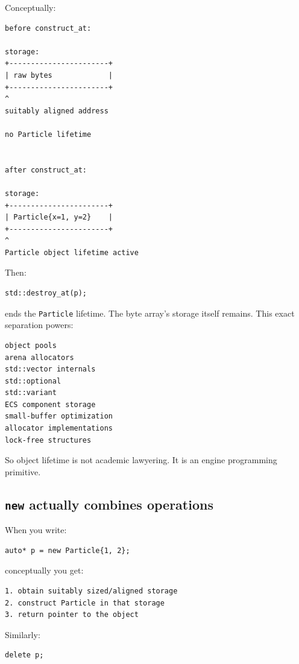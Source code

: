 Conceptually:

\begin{verbatim}
before construct_at:

storage:
+-----------------------+
| raw bytes             |
+-----------------------+
^
suitably aligned address

no Particle lifetime


after construct_at:

storage:
+-----------------------+
| Particle{x=1, y=2}    |
+-----------------------+
^
Particle object lifetime active
\end{verbatim}

Then:

\begin{verbatim}
std::destroy_at(p);
\end{verbatim}

ends the \texttt{Particle} lifetime. The byte array's storage itself remains. This exact separation powers:

\begin{verbatim}
object pools
arena allocators
std::vector internals
std::optional
std::variant
ECS component storage
small-buffer optimization
allocator implementations
lock-free structures
\end{verbatim}

So object lifetime is not academic lawyering. It is an engine programming primitive.

\subsection{\texorpdfstring{\texttt{new} actually combines operations}{new actually combines operations}}\label{05-engine-i-ch002-new-actually-combines-operations}

\hypertarget{05-engine-i-ch002-new-actually-combines-operations}{}

When you write:

\begin{verbatim}
auto* p = new Particle{1, 2};
\end{verbatim}

conceptually you get:

\begin{verbatim}
1. obtain suitably sized/aligned storage
2. construct Particle in that storage
3. return pointer to the object
\end{verbatim}

Similarly:

\begin{verbatim}
delete p;
\end{verbatim}

